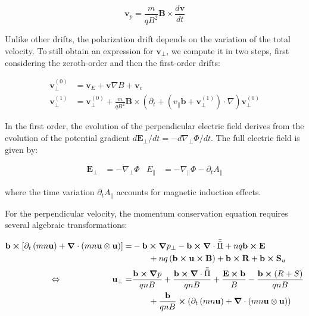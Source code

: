 \begin{equation}
	\mathbf{v}_p = \frac{m}{qB^2}\mathbf{B} \times \frac{d\mathbf{v}}{dt}
\end{equation}

Unlike other drifts, the polarization drift depends on the variation of the total velocity. To still obtain an expression for $\mathbf{v}_\perp$, we compute it in two steps, first considering the zeroth-order and then the first-order drifts:

\begin{align}
	\mathbf{v}_\perp^{(0)} &= \mathbf{v}_E + \mathbf{v}{\nabla B} + \mathbf{v}_c \\
	\mathbf{v}_\perp^{(1)} &= \mathbf{v}_\perp^{(0)} + \frac{m}{qB^2}\mathbf{B} \times \left(\partial_t + \left(v_\parallel\mathbf{b} + \mathbf{v}_\perp^{(1)}\right) \cdot \nabla\right)\mathbf{v}_\perp^{(0)} \label{eq:edge_vPerpDrifts}
\end{align}

In the first order, the evolution of the perpendicular electric field derives from the evolution of the potential gradient $d\mathbf{E}_\perp / dt = -d\nabla_\perp \Phi / dt$. The full electric field is given by:

\begin{align}
	\mathbf{E}_\perp &= -\nabla_\perp \Phi &
	E_\parallel &= -\nabla_\parallel \Phi - \partial_t A_\parallel
\end{align}

where the time variation $\partial_t A_\parallel$ accounts for magnetic induction effects.





For the perpendicular velocity, the momentum conservation equation requires several algebraic transformations:

\begin{align}
	\mathbf{b}\cross\left[\partial_t \left(mn\mathbf{u}\right) + \grad\cdot\left(mn\mathbf{u}\otimes\mathbf{u}\right)\right] =& -\mathbf{b}\cross\grad p_\perp - \mathbf{b}\cross\grad\cdot\bar{\bar{\Pi}} + nq\mathbf{b}\cross\mathbf{E} \nonumber\\ & \qquad + nq\left(\mathbf{b}\cross\mathbf{u}\cross\mathbf{B}\right) + \mathbf{b}\cross\mathbf{R} + \mathbf{b}\cross\mathbf{S}_u \nonumber \\
	\Leftrightarrow\qquad \qquad \qquad
	\mathbf{u}_\perp =& \frac{\mathbf{b}\cross\grad p}{qnB} + \frac{\mathbf{b}\cross\grad\cdot\bar{\bar{\Pi}}}{qnB} +  \frac{\mathbf{E}\cross\mathbf{b}}{B} - \frac{\mathbf{b}\cross\left(R+S\right)}{qnB} \nonumber\\ & \qquad + \frac{\mathbf{b}}{qnB} \cross \left(\partial_t \left(mn\mathbf{u}\right) + \grad\cdot\left(mn\mathbf{u}\otimes\mathbf{u}\right)\right)
\end{align}

